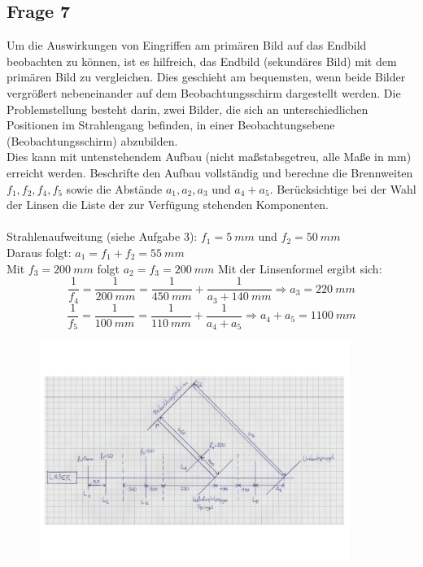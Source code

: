 \documentclass[a4paper,10pt]{scrartcl}
\begin{document}
	\subsection{Frage 7}
		Um die Auswirkungen von Eingriffen am primären Bild auf das Endbild beobachten zu können, ist es hilfreich, das Endbild (sekundäres Bild) mit dem primären Bild zu vergleichen. Dies geschieht am bequemsten, wenn beide Bilder vergrößert nebeneinander auf dem Beobachtungsschirm dargestellt werden. Die Problemstellung besteht darin, zwei Bilder, die sich an unterschiedlichen Positionen im Strahlengang befinden, in einer Beobachtungsebene (Beobachtungsschirm) abzubilden.\\
		Dies kann mit untenstehendem Aufbau (nicht maßstabsgetreu, alle Maße in mm) erreicht werden. Beschrifte den Aufbau vollständig und berechne die Brennweiten $f_1, f_2, f_4, f_5$ sowie die Abstände $a_1, a_2, a_3$ und $a_4 + a_5$. Berücksichtige bei der Wahl der Linsen die Liste der zur Verfügung stehenden Komponenten.
		\\
		\\
		Strahlenaufweitung (siehe Aufgabe 3): $f_1 = \SI{5}{mm}$ und $f_2 = \SI{50}{mm}$\\
		Daraus folgt: $a_1 = f_1 + f_2 = \SI{55}{mm}$\\
		Mit $f_3 = \SI{200}{mm}$ folgt $a_2 = f_3 = \SI{200}{mm}$
		Mit der Linsenformel ergibt sich:
			\[\frac{1}{f_4} = \frac{1}{\SI{200}{mm}} = \frac{1}{\SI{450}{mm}} + \frac{1}{a_3 + \SI{140}{mm}} \Rightarrow a_3 = \SI{220}{mm}\]
			\[\frac{1}{f_5} = \frac{1}{\SI{100}{mm}} = \frac{1}{\SI{110}{mm}} + \frac{1}{a_4 + a_5} \Rightarrow a_4 + a_5 = \SI{1100}{mm}\]
					\begin{figure}[h]
\centering
\includegraphics[width=0.9\textwidth]{./Bilder/ofa7}

\end{figure}
\FloatBarrier
		\\
	
\end{document}
